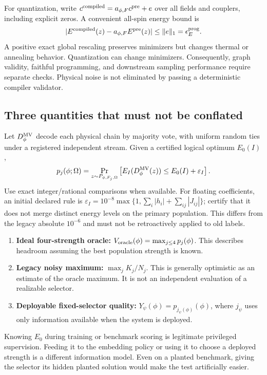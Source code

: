 For quantization, write $c^{\rm compiled}=a_{\phi,F}c^{\rm pre}+e$ over all fields and couplers, including explicit zeros. A convenient all-spin energy bound is
\begin{equation}
|E^{\rm compiled}(z)-a_{\phi,F}E^{\rm pre}(z)|\le \|e\|_1=\epsilon_E^{\rm prog}.
\end{equation}
A positive exact global rescaling preserves minimizers but changes thermal or annealing behavior. Quantization can change minimizers. Consequently, graph validity, faithful programming, and downstream sampling performance require separate checks. Physical noise is not eliminated by passing a deterministic compiler validator.

\subsection{Three quantities that must not be conflated}
Let $D_\phi^{\rm MV}$ decode each physical chain by majority vote, with uniform random ties under a registered independent stream. Given a certified logical optimum $E_0(I)$,
\begin{equation}
p_j(\phi;\Omega)=\Pr_{z\sim P_{\phi,F_j,\Omega}}
\left[E_I(D_\phi^{\rm MV}(z))\le E_0(I)+\varepsilon_I\right].
\label{eq:pj}
\end{equation}
Use exact integer/rational comparisons when available. For floating coefficients, an initial declared rule is $\varepsilon_I=10^{-8}\max\{1,\sum_i|h_i|+\sum_{ij}|J_{ij}|\}$; certify that it does not merge distinct energy levels on the primary population. This differs from the legacy absolute $10^{-6}$ and must not be retroactively applied to old labels.

\begin{enumerate}
\item \textbf{Ideal four-strength oracle:} $V_{\rm oracle}(\phi)=\max_{j\le4}p_j(\phi)$. This describes headroom assuming the best population strength is known.
\item \textbf{Legacy noisy maximum:} $\max_j K_j/N_j$. This is generally optimistic as an estimate of the oracle maximum. It is not an independent evaluation of a realizable selector.
\item \textbf{Deployable fixed-selector quality:} $Y_\psi(\phi)=p_{j_\psi(\phi)}(\phi)$, where $j_\psi$ uses only information available when the system is deployed.
\end{enumerate}
Knowing $E_0$ during training or benchmark scoring is legitimate privileged supervision. Feeding it to the embedding policy or using it to choose a deployed strength is a different information model. Even on a planted benchmark, giving the selector its hidden planted solution would make the test artificially easier.

